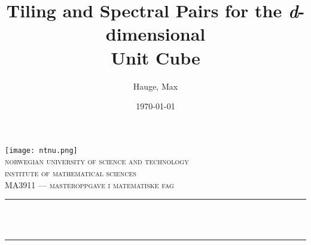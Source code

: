 
\begin{titlepage}
	\title{\textsf{Tiling and Spectral Pairs for the \emph{d}-dimensional\\ Unit Cube}}  %
	\author{Hauge, Max}
	\date{\today}

	\makeatletter
	\let\thetitle\@title
	\let\theauthor\@author
	\let\thedate\@date
	\makeatother


	\centering
    \vspace*{0.5 cm}
    \texttt{[image: ntnu.png]}\\[1.0 cm]
    
	\textsc{\LARGE \textsf{norwegian university of science and technology}}\\[1.0 cm]  %
    
	\textsc{\Large \textsf{institute of mathematical sciences}}\\[0.5 cm]  %
	
	\textsc{\large \textsf{MA3911 — masteroppgave i matematiske fag}}\\[0.5 cm]  %
	
	\rule{\linewidth}{0.2 mm} \\[0.4 cm]
	{ \LARGE \textbf{\uppercase{\thetitle}}}\\
	\rule{\linewidth}{0.2 mm} \\[1.5 cm]
	

\end{titlepage}
